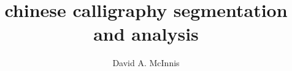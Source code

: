 \documentclass{ewuthesis}
\begin{document}
    \title{chinese calligraphy segmentation and analysis}
    \author{David A. McInnis}    
    \makesigpage
%    

    \makevita
    
    
\end{document}
